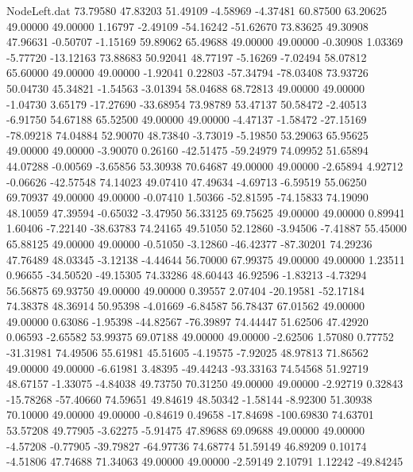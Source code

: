 \begin{filecontents}{NodeLeft.dat}
  73.79580   47.83203   51.49109    -4.58969   -4.37481   60.87500   63.20625   49.00000   49.00000    1.16797   -2.49109  -54.16242  -51.62670
  73.83625   49.30908   47.96631    -0.50707   -1.15169   59.89062   65.49688   49.00000   49.00000   -0.30908    1.03369   -5.77720  -13.12163
  73.88683   50.92041   48.77197    -5.16269   -7.02494   58.07812   65.60000   49.00000   49.00000   -1.92041    0.22803  -57.34794  -78.03408
  73.93726   50.04730   45.34821    -1.54563   -3.01394   58.04688   68.72813   49.00000   49.00000   -1.04730    3.65179  -17.27690  -33.68954
  73.98789   53.47137   50.58472    -2.40513   -6.91750   54.67188   65.52500   49.00000   49.00000   -4.47137   -1.58472  -27.15169  -78.09218
  74.04884   52.90070   48.73840    -3.73019   -5.19850   53.29063   65.95625   49.00000   49.00000   -3.90070    0.26160  -42.51475  -59.24979
  74.09952   51.65894   44.07288    -0.00569   -3.65856   53.30938   70.64687   49.00000   49.00000   -2.65894    4.92712   -0.06626  -42.57548
  74.14023   49.07410   47.49634    -4.69713   -6.59519   55.06250   69.70937   49.00000   49.00000   -0.07410    1.50366  -52.81595  -74.15833
  74.19090   48.10059   47.39594    -0.65032   -3.47950   56.33125   69.75625   49.00000   49.00000    0.89941    1.60406   -7.22140  -38.63783
  74.24165   49.51050   52.12860    -3.94506   -7.41887   55.45000   65.88125   49.00000   49.00000   -0.51050   -3.12860  -46.42377  -87.30201
  74.29236   47.76489   48.03345    -3.12138   -4.44644   56.70000   67.99375   49.00000   49.00000    1.23511    0.96655  -34.50520  -49.15305
  74.33286   48.60443   46.92596    -1.83213   -4.73294   56.56875   69.93750   49.00000   49.00000    0.39557    2.07404  -20.19581  -52.17184
  74.38378   48.36914   50.95398    -4.01669   -6.84587   56.78437   67.01562   49.00000   49.00000    0.63086   -1.95398  -44.82567  -76.39897
  74.44447   51.62506   47.42920     0.06593   -2.65582   53.99375   69.07188   49.00000   49.00000   -2.62506    1.57080    0.77752  -31.31981
  74.49506   55.61981   45.51605    -4.19575   -7.92025   48.97813   71.86562   49.00000   49.00000   -6.61981    3.48395  -49.44243  -93.33163
  74.54568   51.92719   48.67157    -1.33075   -4.84038   49.73750   70.31250   49.00000   49.00000   -2.92719    0.32843  -15.78268  -57.40660
  74.59651   49.84619   48.50342    -1.58144   -8.92300   51.30938   70.10000   49.00000   49.00000   -0.84619    0.49658  -17.84698 -100.69830
  74.63701   53.57208   49.77905    -3.62275   -5.91475   47.89688   69.09688   49.00000   49.00000   -4.57208   -0.77905  -39.79827  -64.97736
  74.68774   51.59149   46.89209     0.10174   -4.51806   47.74688   71.34063   49.00000   49.00000   -2.59149    2.10791    1.12242  -49.84245

\end{filecontents}
